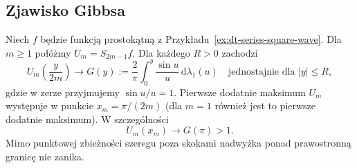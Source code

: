 \subsection{Zjawisko Gibbsa}

\begin{twierdzenie}
\label{thm:dt-gibbs-square}
Niech $f$ będzie funkcją prostokątną z
Przykładu~\ref{ex:dt-series-square-wave}.
Dla $m\ge1$ połóżmy $U_m=S_{2m-1}f$.
Dla każdego $R>0$ zachodzi
\[
 U_m\left(\frac{y}{2m}\right)
 \longrightarrow G(y):=\frac2\pi
 \int_0^y\frac{\sin u}{u}\,\mathrm d\lambda_1(u)
 \quad\text{jednostajnie dla } |y|\le R,
\]
gdzie w zerze przyjmujemy $\sin u/u=1$.
Pierwsze dodatnie maksimum $U_m$ występuje
w punkcie $x_m=\pi/(2m)$ (dla $m=1$ również
jest to pierwsze dodatnie maksimum).
W szczególności
\[
 U_m(x_m)\longrightarrow G(\pi)>1.
\]
Mimo punktowej zbieżności szeregu poza skokami
nadwyżka ponad prawostronną granicę nie zanika.
\end{twierdzenie}

